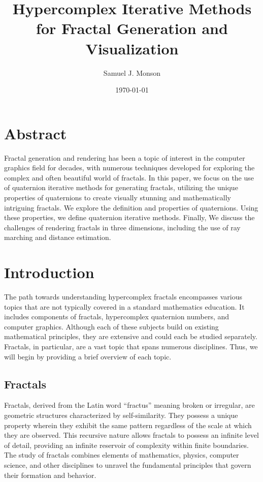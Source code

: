 \documentclass[11pt,hidelinks]{article}
\author{Samuel J. Monson}
\date{\today}
\title{Hypercomplex Iterative Methods for Fractal Generation and Visualization}
\numberwithin{equation}{section} %
\theoremstyle{bf}
\theoremstyle{indentbf}
\begin{document}
\maketitle
\section*{Abstract}
\label{sec:org5a50dc5}
Fractal generation and rendering has been a topic of interest in the computer graphics field for decades, with numerous techniques developed for exploring the complex and often beautiful world of fractals. In this paper, we focus on the use of quaternion iterative methods for generating fractals, utilizing the unique properties of quaternions to create visually stunning and mathematically intriguing fractals. We explore the definition and properties of quaternions. Using these properties, we define quaternion iterative methods. Finally, We discuss the challenges of rendering fractals in three dimensions, including the use of ray marching and distance estimation.

\clearpage %
\setcounter{tocdepth}{3}
\tableofcontents
\clearpage %

\section{Introduction}
\label{sec:org2b19630}

The path towards understanding hypercomplex fractals encompasses various topics that are not typically covered in a standard mathematics education. It includes components of fractals, hypercomplex quaternion numbers, and computer graphics. Although each of these subjects build on existing mathematical principles, they are extensive and could each be studied separately. Fractals, in particular, are a vast topic that spans numerous disciplines. Thus, we will begin by providing a brief overview of each topic.

\subsection{Fractals}
\label{sec:orgc478bbc}

Fractals, derived from the Latin word ``fractus'' meaning broken or irregular, are geometric structures characterized by self-similarity. They possess a unique property wherein they exhibit the same pattern regardless of the scale at which they are observed. This recursive nature allows fractals to possess an infinite level of detail, providing an infinite reservoir of complexity within finite boundaries. The study of fractals combines elements of mathematics, physics, computer science, and other disciplines to unravel the fundamental principles that govern their formation and behavior.
\end{document}
